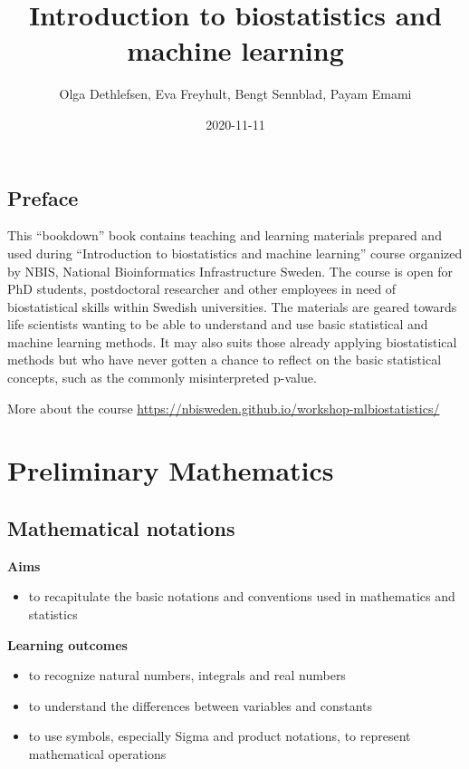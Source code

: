 \documentclass[
]{book}
\title{Introduction to biostatistics and machine learning}
\author{Olga Dethlefsen, Eva Freyhult, Bengt Sennblad, Payam Emami}
\date{2020-11-11}
\providecommand{\tightlist}{%
  \setlength{\itemsep}{0pt}\setlength{\parskip}{0pt}}
\theoremstyle{definition}
\theoremstyle{definition}
\theoremstyle{definition}
\theoremstyle{remark}
\begin{document}
\maketitle

{
\setcounter{tocdepth}{1}
\tableofcontents
}
\hypertarget{preface}{%
\chapter*{Preface}\label{preface}}

This ``bookdown'' book contains teaching and learning materials prepared and used during ``Introduction to biostatistics and machine learning'' course organized by NBIS, National Bioinformatics Infrastructure Sweden. The course is open for PhD students, postdoctoral researcher and other employees in need of biostatistical skills within Swedish universities. The materials are geared towards life scientists wanting to be able to understand and use basic statistical and machine learning methods. It may also suits those already applying biostatistical methods but who have never gotten a chance to reflect on the basic statistical concepts, such as the commonly misinterpreted p-value.

More about the course \url{https://nbisweden.github.io/workshop-mlbiostatistics/}

\hypertarget{part-preliminary-mathematics}{%
\part{Preliminary Mathematics}\label{part-preliminary-mathematics}}

\hypertarget{mathematical-notations}{%
\chapter{Mathematical notations}\label{mathematical-notations}}

\textbf{Aims}

\begin{itemize}
\tightlist
\item
  to recapitulate the basic notations and conventions used in mathematics and statistics
\end{itemize}

\textbf{Learning outcomes}

\begin{itemize}
\tightlist
\item
  to recognize natural numbers, integrals and real numbers
\item
  to understand the differences between variables and constants
\item
  to use symbols, especially Sigma and product notations, to represent mathematical operations
\end{itemize}
\end{document}
